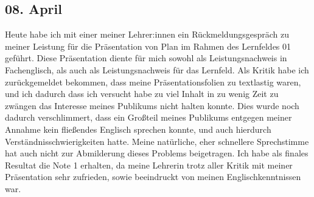 \subsection{08. April}
Heute habe ich mit einer meiner Lehrer:innen ein Rückmeldungsgespräch zu meiner Leistung für die Präsentation von Plan im Rahmen des Lernfeldes 01 geführt. Diese Präsentation diente für mich sowohl als Leistungsnachweis in Fachenglisch, als auch als Leistungsnachweis für das Lernfeld. Als Kritik habe ich zurückgemeldet bekommen, dass meine Präsentationsfolien zu textlastig waren, und ich dadurch dass ich versucht habe zu viel Inhalt in zu wenig Zeit zu zwängen das Interesse meines Publikums nicht halten konnte. Dies wurde noch dadurch verschlimmert, dass ein Großteil meines Publikums entgegen meiner Annahme kein fließendes Englisch sprechen konnte, und auch hierdurch Verständnisschwierigkeiten hatte. Meine natürliche, eher schnellere Sprechstimme hat auch nicht zur Abmilderung dieses Problems beigetragen. Ich habe als finales Resultat die Note 1 erhalten, da meine Lehrerin trotz aller Kritik mit meiner Präsentation sehr zufrieden, sowie beeindruckt von meinen Englischkenntnissen war.